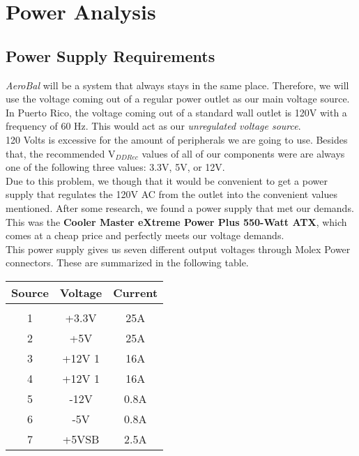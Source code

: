 \section{Power Analysis}

	\subsection{Power Supply Requirements}
		\textit{AeroBal} will be a system that always stays in the same place. Therefore, we will use the voltage coming out of a regular power outlet as our main voltage source. In Puerto Rico, the voltage coming out of a standard wall outlet is 120V with a frequency of 60 Hz\cite{ref:pAnalysis1}. This would act as our \textit{unregulated voltage source}. \\

		120 Volts is excessive for the amount of peripherals we are going to use. Besides that, the recommended V$_{DD Rec}$ values of all of our components were are always one of the following three values: 3.3V, 5V, or 12V. \\

		Due to this problem, we though that it would be convenient to get a power supply that regulates the 120V AC from the outlet into the convenient values mentioned. After some research, we found a power supply that met our demands. This was the \textbf{Cooler Master eXtreme Power Plus 550-Watt ATX}, which comes at a cheap price and perfectly meets our voltage demands. \\ 

		This power supply gives us seven different output voltages through Molex Power connectors. These are summarized in the following table. \\

		\begin{tabular}{|c|c|c|}
			\hline
				Source & Voltage & Current  \\
			\hline
				& & \\
				1 & +3.3V & 25A  \\
				2 & +5V & 25A  \\
				3 & +12V 1 & 16A  \\
				4 & +12V 1 & 16A  \\
				5 & -12V & 0.8A  \\
				6 & -5V & 0.8A  \\
				7 & +5VSB & 2.5A  \\
			\hline
		\end{tabular} \\


